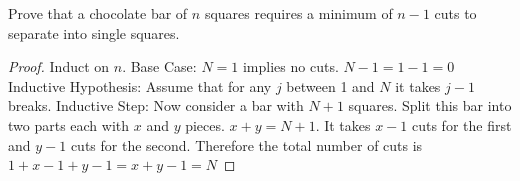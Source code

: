 \question Prove that a chocolate bar of $n$ squares requires a 
minimum of $n - 1$ cuts to separate into single squares.

\begin{solution}
\begin{proof} Induct on $n$. \newline
Base Case: $N = 1$ implies no cuts. $N - 1 = 1 - 1 = 0$ \newline
Inductive Hypothesis: Assume that for any $j$ between 1 and $N$ it 
takes $j - 1$ breaks.\newline
Inductive Step: Now consider a bar with $N + 1$ squares. Split 
this bar into two parts each with $x$ and $y$ pieces. $x + y = N + 1$. 
It takes $x-1$ cuts for the first and $y - 1$ cuts for the second. 
Therefore the total number of cuts is $1 + x-1 + y-1 = x+y-1 = N $
\end{proof}
\end{solution}

\clearpage